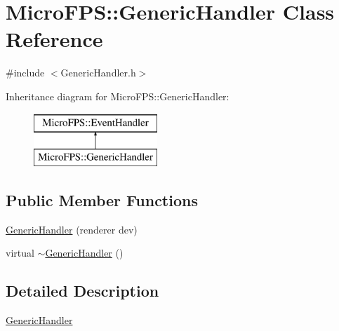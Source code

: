 \hypertarget{class_micro_f_p_s_1_1_generic_handler}{
\section{MicroFPS::GenericHandler Class Reference}
\label{d6/d17/class_micro_f_p_s_1_1_generic_handler}
}


{\ttfamily \#include $<$GenericHandler.h$>$}

Inheritance diagram for MicroFPS::GenericHandler:\begin{figure}[H]
\begin{center}
\leavevmode
\includegraphics[height=2.000000cm]{d6/d17/class_micro_f_p_s_1_1_generic_handler}
\end{center}
\end{figure}
\subsection*{Public Member Functions}
\begin{DoxyCompactItemize}
\item 
\hyperlink{class_micro_f_p_s_1_1_generic_handler_af8bdc4d6b394f5e64060ca605a7f4543}{GenericHandler} (renderer dev)
\item 
virtual \hyperlink{class_micro_f_p_s_1_1_generic_handler_ae745b2c5a0112f9d845d48875f00fe8a}{$\sim$GenericHandler} ()
\end{DoxyCompactItemize}


\subsection{Detailed Description}
\hyperlink{class_micro_f_p_s_1_1_generic_handler}{GenericHandler} 

